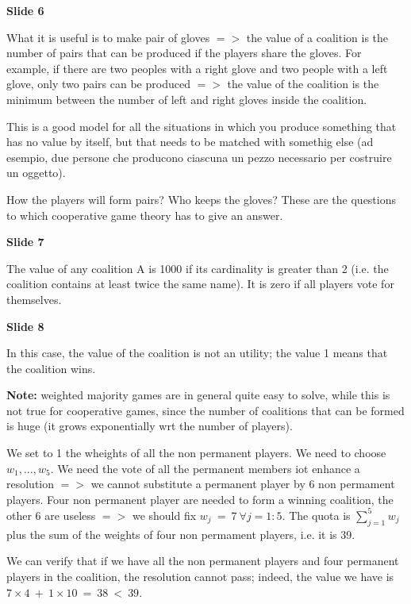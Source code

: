 \documentclass[pt11,a4paper,twoside,reqno,openright]{paper}
\begin{document}
\bigskip
\noindent \textbf{Slide 6}

\noindent What it is useful is to make pair of gloves $=>$ the value of a 
coalition is the number of pairs that can be produced if the players share 
the gloves. For example, if there are two peoples with a right glove and 
two people with a left glove, only two pairs can be produced $=>$ the value 
of the coalition is the minimum between the number of left and right gloves 
inside the coalition.

\noindent This is a good model for all the situations in which you produce 
something that has no value by itself, but that needs to be matched with 
somethig else (ad esempio, due persone che producono ciascuna un pezzo 
necessario per costruire un oggetto).

\noindent How the players will form pairs? Who keeps the gloves? These are the 
questions to which cooperative game theory has to give an answer.

\bigskip
\noindent \textbf{Slide 7}

\noindent The value of any coalition A is 1000 if its cardinality is greater 
than 2 (i.e. the coalition contains at least twice the same name). It is zero 
if all players vote for themselves.

\bigskip
\noindent \textbf{Slide 8}

\noindent In this case, the value of the coalition is not an utility; the 
value 1 means that the coalition wins.

\noindent \textbf{Note:} weighted majority games are in general quite easy to 
solve, while this is not true for cooperative games, since the number of 
coalitions that can be formed is huge (it grows exponentially wrt the number 
of players).

\noindent We set to 1 the wheights of all the non permanent players. We need 
to choose $w_1,...,w_5$. We need the vote of all the permanent members iot 
enhance a resolution $=>$ we cannot substitute a permanent player by 6 non 
permament players. Four non permanent player are needed to form a 
winning coalition, the other 6 are useless $=>$ we should fix $w_j~=~7~
\forall j=1:5$. The quota is $\sum_{j=1}^5{w_j}$ plus the sum of the 
weights of four non permament players, i.e. it is 39.

\noindent We can verify that if we have all the non permanent players and four 
permanent players in the coalition, the resolution cannot pass; indeed, the 
value we have is $7 \times 4 ~+~ 1 \times 10 ~=~ 38 ~<~ 39$.
\end{document}
